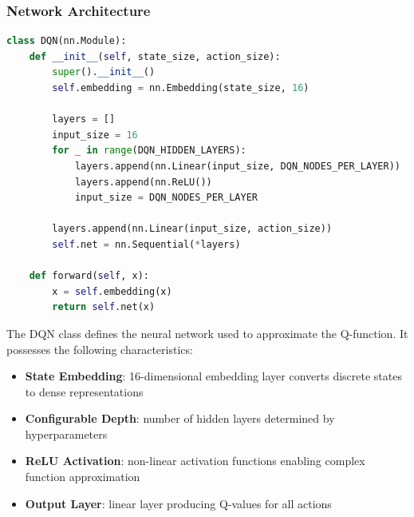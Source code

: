\documentclass[a4paper,12pt]{article}
\begin{document}
\subsubsection{Network Architecture}
\begin{lstlisting}[language=Python]
class DQN(nn.Module):
    def __init__(self, state_size, action_size):
        super().__init__()
        self.embedding = nn.Embedding(state_size, 16)
        
        layers = []
        input_size = 16
        for _ in range(DQN_HIDDEN_LAYERS):
            layers.append(nn.Linear(input_size, DQN_NODES_PER_LAYER))
            layers.append(nn.ReLU())
            input_size = DQN_NODES_PER_LAYER
            
        layers.append(nn.Linear(input_size, action_size))
        self.net = nn.Sequential(*layers)
    
    def forward(self, x):
        x = self.embedding(x)
        return self.net(x)
\end{lstlisting}
The DQN class defines the neural network used to approximate the Q-function. It possesses the following characteristics:
\begin{itemize}
    \item \textbf{State Embedding}: 16-dimensional embedding layer converts discrete states to dense representations
    \item \textbf{Configurable Depth}: number of hidden layers determined by hyperparameters
    \item \textbf{ReLU Activation}: non-linear activation functions enabling complex function approximation
    \item \textbf{Output Layer}: linear layer producing Q-values for all actions
\end{itemize}
\end{document}
